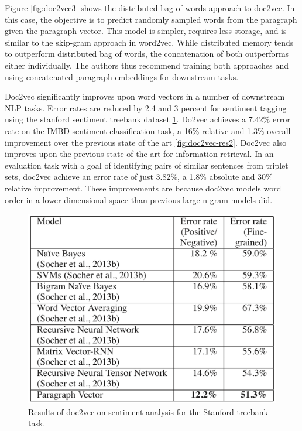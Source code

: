 Figure \ref{fig:doc2vec3} shows the distributed bag of words approach to doc2vec. In this case, the objective is to predict randomly sampled words from the paragraph given the paragraph vector. This model is simpler, requires less storage, and is similar to the skip-gram approach in word2vec. While distributed memory tends to outperform distributed bag of words, the concatenation of both outperforms either individually. The authors thus recommend training both approaches and using concatenated paragraph embeddings for downstream tasks.

Doc2vec significantly improves upon word vectors in a number of downstream NLP tasks. Error rates are reduced by 2.4 and 3 percent for sentiment tagging using the stanford sentiment treebank dataset \ref{fig:doc2vec-res1}. Do2vec achieves a 7.42\% error rate on the IMBD sentiment classification task, a 16\% relative and 1.3\% overall improvement over the previous state of the art \ref{fig:doc2vec-res2}. Doc2vec also improves upon the previous state of the art for information retrieval. In an evaluation task with a goal of identifying pairs of similar sentences from triplet sets, doc2vec achieve an error rate of just 3.82\%, a 1.8\% absolute and 30\% relative improvement. These improvements are because doc2vec models word order in a lower dimensional space than previous large n-gram models did.


\begin{figure}
\centering
  \includegraphics[width=.7\linewidth]{files/doc2vec-4.png}
  \caption{Results of doc2vec on sentiment analysis for the Stanford treebank task.}
  \label{fig:doc2vec-res1}
\end{figure}

